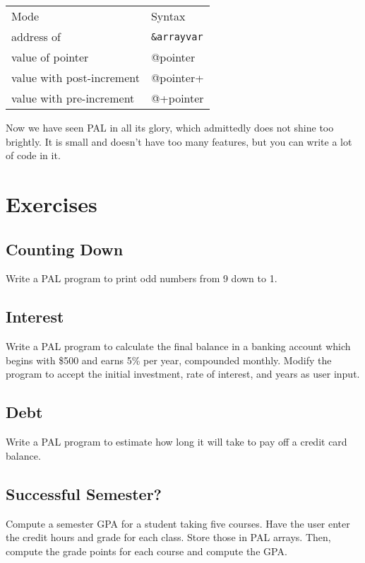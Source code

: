 \begin{tabular}{l l }
    Mode                      &  Syntax \\
    address of                &  \verb+&arrayvar+ \\
    value of pointer          &  @pointer \\
    value with post-increment &  @pointer+ \\
    value with pre-increment  &  @+pointer \\
\end{tabular}

Now we have seen PAL in all its glory, which admittedly does not shine
too brightly.
It is small and doesn't have too many features, but you can write a lot
of code in it.

\section{Exercises}


\subsection{Counting Down}

Write a PAL program to print odd numbers from 9 down to 1.

\subsection{Interest}

Write a PAL program to calculate the final balance in a banking account
which begins with \$500 and earns 5\% per year, compounded monthly.
Modify the program to accept the initial investment, rate of interest,
and years as user input.

\subsection{Debt}

Write a PAL program to estimate how long it will take to pay off
a credit card balance.

\subsection{Successful Semester?}

Compute a semester GPA for a student taking five courses. Have the
user enter the credit hours and grade for each class. Store those
in PAL arrays. Then, compute the grade points for each course
and compute the GPA.
